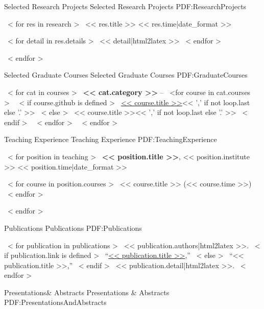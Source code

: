 \documentclass[letterpaper,MMMyyyy,nonstopmode]{simpleresumecv}
\begin{document}
\begin{Body}
\Section
{Selected Research Projects}
{Selected Research Projects}
{PDF:ResearchProjects}

~< for res in research >~
    \Entry
    << res.title >>
    \hfill
    << res.time|date_format >>
    \begin{Detail}
    ~< for detail in res.details >~
        \BulletItem
        << detail|html2latex >>
    ~< endfor >~
    \end{Detail}
~< endfor >~

\Section
{Selected Graduate Courses}
{Selected Graduate Courses}
{PDF:GraduateCourses}

~< for cat in courses >~
    \Entry
    \textbf{<< cat.category >>}
    --
    ~<for course in cat.courses >~
        ~< if course.github is defined >~
            \href{https://github.com/stevenliuyi/<< course.github >>}{<< course.title >>}<< ',' if not loop.last else '.' >>
        ~< else >~
            << course.title >><< ',' if not loop.last else '.' >>
        ~< endif >~
        \nolinebreak
    ~< endfor >~
    \Gap
~< endfor >~


\Section
{Teaching Experience}
{Teaching Experience}
{PDF:TeachingExperience}

~< for position in teaching >~
    \Entry
    \textbf{<< position.title >>},
    << position.institute >>
    \hfill
    << position.time|date_format >>
    \begin{Detail}
    ~< for course in position.courses >~
        \BulletItem
        << course.title >> (<< course.time >>)
    ~< endfor >~
    \end{Detail}
~< endfor >~


\Section
{Publications}
{Publications}
{PDF:Publications}

~< for publication in publications >~
    \Entry
    << publication.authors|html2latex >>.
    ~< if publication.link is defined >~
        ``\href{<< publication.link >>}{<< publication.title >>},''
    ~< else >~
        ``<< publication.title >>,''
    ~< endif >~
    << publication.detail|html2latex >>.
    \Gap
~< endfor >~


\Section
{Presentations\newline\& Abstracts}
{Presentations \& Abstracts}
{PDF:PresentationsAndAbstracts}


\end{Body}
\end{document}
